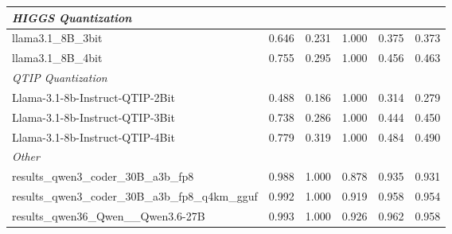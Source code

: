 \begin{table}[htbp]
{\begin{tabular}{lrrrrr}
    \midrule
    \multicolumn{6}{l}{\textit{HIGGS Quantization}} \\
    \midrule
    llama3.1\_8B\_3bit & 0.646 & 0.231 & 1.000 & 0.375 & 0.373 \\
    llama3.1\_8B\_4bit & 0.755 & 0.295 & 1.000 & 0.456 & 0.463 \\
    \midrule
    \multicolumn{6}{l}{\textit{QTIP Quantization}} \\
    \midrule
    Llama-3.1-8b-Instruct-QTIP-2Bit & 0.488 & 0.186 & 1.000 & 0.314 & 0.279 \\
    Llama-3.1-8b-Instruct-QTIP-3Bit & 0.738 & 0.286 & 1.000 & 0.444 & 0.450 \\
    Llama-3.1-8b-Instruct-QTIP-4Bit & 0.779 & 0.319 & 1.000 & 0.484 & 0.490 \\
    \midrule
    \multicolumn{6}{l}{\textit{Other}} \\
    \midrule
    results\_qwen3\_coder\_30B\_a3b\_fp8 & 0.988 & 1.000 & 0.878 & 0.935 & 0.931 \\
    results\_qwen3\_coder\_30B\_a3b\_fp8\_q4km\_gguf & 0.992 & 1.000 & 0.919 & 0.958 & 0.954 \\
    results\_qwen36\_Qwen\_\_Qwen3.6-27B & 0.993 & 1.000 & 0.926 & 0.962 & 0.958 \\
    \bottomrule
  \end{tabular}
  }
\end{table}

